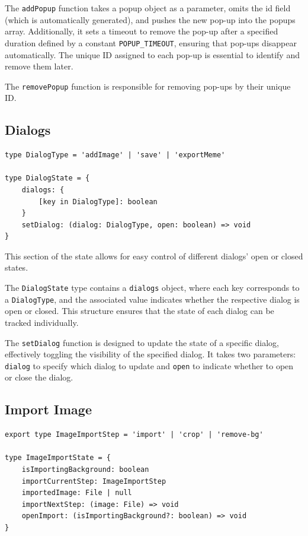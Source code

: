 The \texttt{addPopup} function takes a popup object as a parameter, omits the id field (which is automatically generated), and pushes the new pop-up into the popups array. Additionally, it sets a timeout to remove the pop-up after a specified duration defined by a constant \texttt{POPUP\_TIMEOUT}, ensuring that pop-ups disappear automatically. The unique ID assigned to each pop-up is essential to identify and remove them later.

The \texttt{removePopup} function is responsible for removing pop-ups by their unique ID.

\subsection{Dialogs}
\begin{verbatim}
type DialogType = 'addImage' | 'save' | 'exportMeme'

type DialogState = {
    dialogs: {
        [key in DialogType]: boolean
    }
    setDialog: (dialog: DialogType, open: boolean) => void
}
\end{verbatim}

This section of the state allows for easy control of different dialogs' open or closed states.

The \texttt{DialogState} type contains a \texttt{dialogs} object, where each key corresponds to a \texttt{DialogType}, and the associated value indicates whether the respective dialog is open or closed. This structure ensures that the state of each dialog can be tracked individually.

The \texttt{setDialog} function is designed to update the state of a specific dialog, effectively toggling the visibility of the specified dialog. It takes two parameters: \texttt{dialog} to specify which dialog to update and \texttt{open} to indicate whether to open or close the dialog.

\subsection{Import Image}
\begin{verbatim}
export type ImageImportStep = 'import' | 'crop' | 'remove-bg'

type ImageImportState = {
    isImportingBackground: boolean
    importCurrentStep: ImageImportStep
    importedImage: File | null
    importNextStep: (image: File) => void
    openImport: (isImportingBackground?: boolean) => void
}
\end{verbatim}

